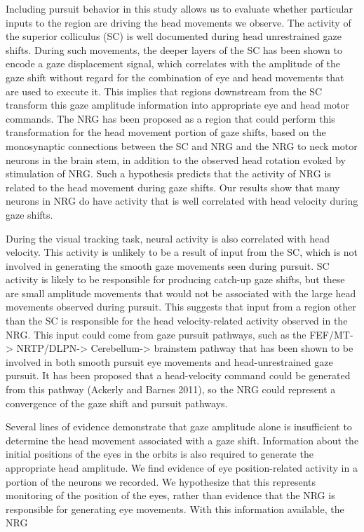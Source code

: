 \documentclass[]{article}
\begin{document}
Including pursuit behavior in this study allows us to evaluate whether
particular inputs to the region are driving the head movements we
observe. The activity of the superior colliculus (SC) is well documented
during head unrestrained gaze shifts. During such movements, the deeper
layers of the SC has been shown to encode a gaze displacement signal,
which correlates with the amplitude of the gaze shift without regard for
the combination of eye and head movements that are used to execute it.
This implies that regions downstream from the SC transform this gaze
amplitude information into appropriate eye and head motor commands. The
NRG has been proposed as a region that could perform this transformation
for the head movement portion of gaze shifts, based on the monosynaptic
connections between the SC and NRG and the NRG to neck motor neurons in
the brain stem, in addition to the observed head rotation evoked by
stimulation of NRG. Such a hypothesis predicts that the activity of NRG
is related to the head movement during gaze shifts. Our results show
that many neurons in NRG do have activity that is well correlated with
head velocity during gaze shifts.

During the visual tracking task, neural activity is also correlated with
head velocity. This activity is unlikely to be a result of input from
the SC, which is not involved in generating the smooth gaze movements
seen during pursuit. SC activity is likely to be responsible for
producing catch-up gaze shifts, but these are small amplitude movements
that would not be associated with the large head movements observed
during pursuit. This suggests that input from a region other than the SC
is responsible for the head velocity-related activity observed in the
NRG. This input could come from gaze pursuit pathways, such as the
FEF/MT-\textgreater{} NRTP/DLPN-\textgreater{} Cerebellum-\textgreater{}
brainstem pathway that has been shown to be involved in both smooth
pursuit eye movements and head-unrestrained gaze pursuit. It has been
proposed that a head-velocity command could be generated from this
pathway (Ackerly and Barnes 2011), so the NRG could represent a
convergence of the gaze shift and pursuit pathways.

Several lines of evidence demonstrate that gaze amplitude alone is
insufficient to determine the head movement associated with a gaze
shift. Information about the initial positions of the eyes in the orbits
is also required to generate the appropriate head amplitude. We find
evidence of eye position-related activity in a portion of the neurons we
recorded. We hypothesize that this represents monitoring of the position
of the eyes, rather than evidence that the NRG is responsible for
generating eye movements. With this information available, the NRG
\end{document}
